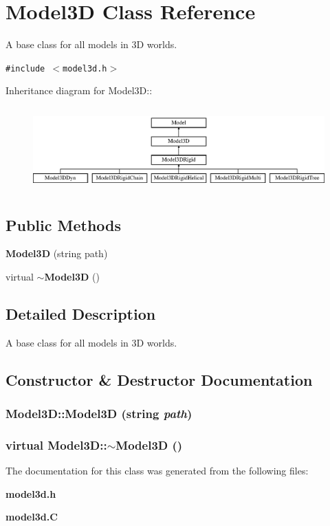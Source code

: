 \section{Model3D  Class Reference}
\label{classModel3D}
A base class for all models in 3D worlds. 


{\tt \#include $<$model3d.h$>$}

Inheritance diagram for Model3D::\begin{figure}[H]
\begin{center}
\leavevmode
\includegraphics[height=3.24638cm]{classModel3D}
\end{center}
\end{figure}
\subsection*{Public Methods}
\begin{CompactItemize}
\item 
{\bf Model3D} (string path)
\item 
virtual {\bf $\sim$Model3D} ()
\end{CompactItemize}


\subsection{Detailed Description}
A base class for all models in 3D worlds.



\subsection{Constructor \& Destructor Documentation}
\subsubsection{\setlength{\rightskip}{0pt plus 5cm}Model3D::Model3D (string {\em path})}\label{classModel3D_a0}


\subsubsection{\setlength{\rightskip}{0pt plus 5cm}virtual Model3D::$\sim$Model3D ()\hspace{0.3cm}{\tt  [inline, virtual]}}\label{classModel3D_a1}




The documentation for this class was generated from the following files:\begin{CompactItemize}
\item 
{\bf model3d.h}\item 
{\bf model3d.C}\end{CompactItemize}
